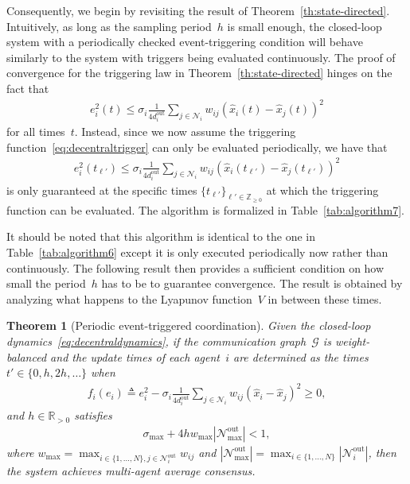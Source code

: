 \documentclass[]{book}
\newtheorem{theorem}{Theorem}[section]
\newcommand{\realpositive}{\mathbb{R}_{>0}}
\newcommand{\integernonnegative}{\mathbb{Z}_{\ge 0}}
\newcommand{\GG}{{\mathcal{G}}}
\newcommand{\NN}{{\mathcal{N}}}
\newcommand{\Nouti}{\mathcal{N}_i^{\operatorname{out}}}
\newcommand{\Noutmax}{\mathcal{N}_{\max}^{\operatorname{out}}}
\newcommand{\until}[1]{\{1,\dots, #1\}}
\begin{document}
Consequently, we begin by revisiting the result of
Theorem~\ref{th:state-directed}. Intuitively, as long as the sampling
period~$h$ is small enough, the closed-loop system with a periodically
checked event-triggering condition will behave similarly to the system
with triggers being evaluated continuously. The proof of convergence
for the triggering law in Theorem~\ref{th:state-directed} hinges on
the fact that
\begin{align*}
  e_i^2(t) \leq \sigma_i \frac{1}{4 d_i^\text{out}} \sum_{j \in \NN_i}
  w_{ij} (\hat{x}_i(t) - \hat{x}_j(t))^2
\end{align*}
for all times~$t$. Instead, since we now assume the triggering
function~\ref{eq:decentraltrigger} can only be evaluated periodically,
we have that
\begin{align}\label{eq:enforceperiodic}
  e_i^2(t_{\ell'}) \leq \sigma_i \frac{1}{4 d_i^\text{out}} \sum_{j
    \in \NN_i} w_{ij} (\hat{x}_i(t_{\ell'}) - \hat{x}_j(t_{\ell'}))^2
\end{align}
is only guaranteed at the specific times $\{ t_{\ell'} \}_{\ell' \in
  \integernonnegative}$ at which the triggering function can be
evaluated. The algorithm is formalized in Table~\ref{tab:algorithm7}.

It should be noted that this algorithm is identical to the one in
Table~\ref{tab:algorithm6} except it is only executed periodically now
rather than continuously.  The following result then provides a
sufficient condition on how small the period~$h$ has to be to
guarantee convergence. The result is obtained by analyzing what
happens to the Lyapunov function~$V$ in between these
times. %

\begin{theorem}[Periodic event-triggered coordination]\label{th:sampled-data}
  Given the closed-loop dynamics~\eqref{eq:decentraldynamics}, if the
  communication graph~$\GG$ is weight-balanced and the update times of
  each agent~$i$ are determined as the times $t' \in \{0, h, 2h, \dots
  \}$ when
  \begin{align*}
  f_i(e_i) \triangleq e_i^2 - \sigma_i \frac{1}{4 d_i^\text{out}} \sum_{j \in
      \NN_i} w_{ij} (\hat{x}_i - \hat{x}_j)^2 \geq 0,
  \end{align*}
  and $h \in \realpositive$ satisfies
  \begin{align}\label{eq:bound}
    \sigma_{\max} + 4 h w_{\max} |\Noutmax | < 1,
  \end{align}
  where $ w_{\max} = \max_{i \in \until{N}, j \in \NN_i^\text{out}} w_{ij}$ and
  $|\Noutmax | = \max_{i \in \until{N}} |\Nouti |$,
  then the system achieves multi-agent average consensus.
\end{theorem}
\end{document}
